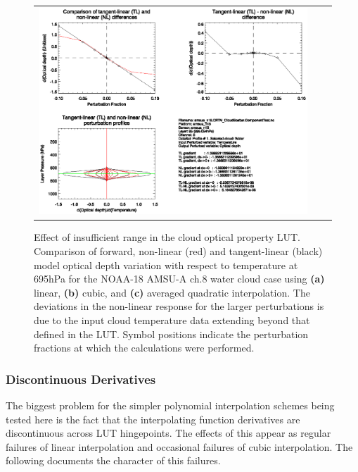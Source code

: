 \begin{figure}[htp]
\begin{tabular}{c c c}
    \includegraphics[bb=90 400 300 540,clip,scale=0.7]{graphics/Cloud/TL/amsua_n18.ch8.WATER.AVGQUAD.dOd_dT.eps}
  \end{tabular}
  \caption{Effect of insufficient range in the cloud optical property LUT. Comparison of forward, non-linear (red) and tangent-linear (black) model optical depth variation with respect to temperature at 695hPa for the NOAA-18 AMSU-A ch.8 water cloud case using \textbf{(a)} linear, \textbf{(b)} cubic, and \textbf{(c)} averaged quadratic interpolation. The deviations in the non-linear response for the larger perturbations is due to the input cloud temperature data extending beyond that defined in the LUT. Symbol positions indicate the perturbation fractions at which the calculations were performed.}
  \label{fig:amsua_n18.ch8.WATER.dOd_dT}
\end{figure}

\subsubsection{Discontinuous Derivatives}
\label{sec:Discontinuous.derivatives.Cloud}
The biggest problem for the simpler polynomial interpolation schemes being tested here is the fact that the interpolating function derivatives are discontinuous across LUT hingepoints. The effects of this appear as regular failures of linear interpolation and occasional failures of cubic interpolation. The following documents the character of this failures.

